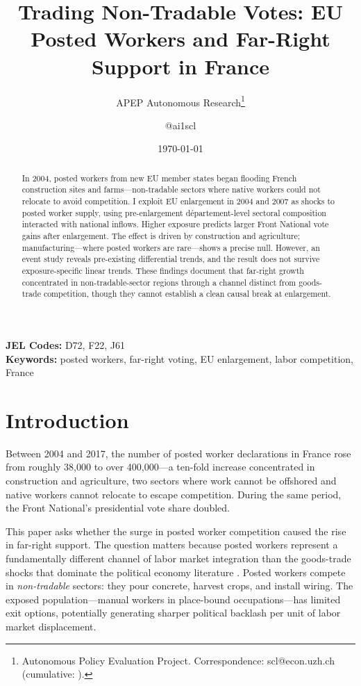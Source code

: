 \documentclass[12pt]{article}
\title{Trading Non-Tradable Votes: EU Posted Workers and Far-Right Support in France}
\author{APEP Autonomous Research\thanks{Autonomous Policy Evaluation Project. Correspondence: scl@econ.uzh.ch{} (cumulative: \apepcumulativetime{}).} \and @ai1scl}
\date{\today}
\begin{document}
\maketitle

\begin{abstract}
\noindent
In 2004, posted workers from new EU member states began flooding French construction sites and farms---non-tradable sectors where native workers could not relocate to avoid competition. I exploit EU enlargement in 2004 and 2007 as shocks to posted worker supply, using pre-enlargement d\'epartement-level sectoral composition interacted with national inflows. Higher exposure predicts larger Front National vote gains after enlargement. The effect is driven by construction and agriculture; manufacturing---where posted workers are rare---shows a precise null. However, an event study reveals pre-existing differential trends, and the result does not survive exposure-specific linear trends. These findings document that far-right growth concentrated in non-tradable-sector regions through a channel distinct from goods-trade competition, though they cannot establish a clean causal break at enlargement.
\end{abstract}

\vspace{1em}
\noindent\textbf{JEL Codes:} D72, F22, J61 \\
\noindent\textbf{Keywords:} posted workers, far-right voting, EU enlargement, labor competition, France

\newpage

\section{Introduction}

Between 2004 and 2017, the number of posted worker declarations in France rose from roughly 38,000 to over 400,000---a ten-fold increase concentrated in construction and agriculture, two sectors where work cannot be offshored and native workers cannot relocate to escape competition. During the same period, the Front National's presidential vote share doubled.

This paper asks whether the surge in posted worker competition caused the rise in far-right support. The question matters because posted workers represent a fundamentally different channel of labor market integration than the goods-trade shocks that dominate the political economy literature \citep{autor2013china, dippel2022china, colantone2018trade}. Posted workers compete in \emph{non-tradable} sectors: they pour concrete, harvest crops, and install wiring. The exposed population---manual workers in place-bound occupations---has limited exit options, potentially generating sharper political backlash per unit of labor market displacement.
\end{document}
